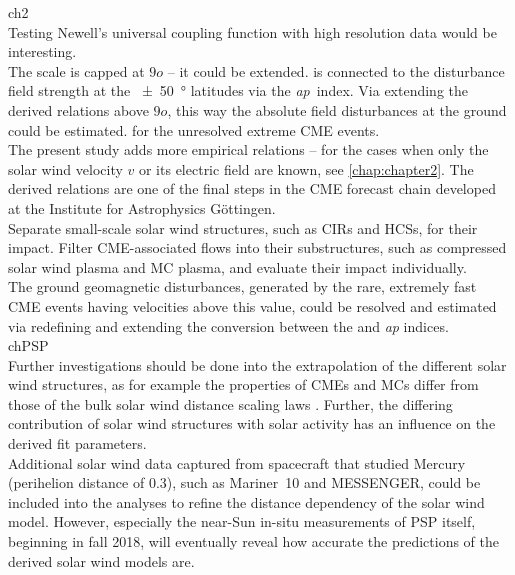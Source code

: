 

ch2\\
Testing Newell's universal coupling function with high resolution data would be interesting.\\

The \Kp{} scale is capped at $9o$ -- it could be extended. \Kp{} is connected to the disturbance field strength at the \SI{+-50}{\degree} latitudes via the \textit{ap}~index. Via extending the derived \Kp{} relations above $9o$, this way the absolute field disturbances at the ground could be estimated. for the unresolved extreme CME events.\\

The present study adds more empirical \Kp{} relations -- for the cases when only the solar wind velocity $v$ or its electric field \vBz{} are known, see \autoref{chap:chapter2}. The derived \Kp{} relations are one of the final steps in the CME forecast chain developed at the Institute for Astrophysics Göttingen.\\

Separate small-scale solar wind structures, such as CIRs and HCSs, for their \Kp{} impact. Filter CME-associated flows into their substructures, such as compressed solar wind plasma and MC plasma, and evaluate their \Kp{} impact individually.\\

The ground geomagnetic disturbances, generated by the rare, extremely fast CME events having velocities above this value, could be resolved and estimated via redefining and extending the conversion between the \Kp{} and \textit{ap} indices.\\

chPSP\\
Further investigations should be done into the extrapolation of the different solar wind structures, as for example the properties of CMEs and MCs differ from those of the bulk solar wind distance scaling laws \citep{Bothmer1998}. Further, the differing contribution of solar wind structures with solar activity has an influence on the derived fit parameters.\\

Additional solar wind data captured from spacecraft that studied Mercury (perihelion distance of \SI{0.3}{\au}), such as Mariner~10 and MESSENGER, could be included into the analyses to refine the distance dependency of the solar wind model.
However, especially the near-Sun in-situ measurements of PSP itself, beginning in fall 2018, will eventually reveal how accurate the predictions of the derived solar wind models are.\\

